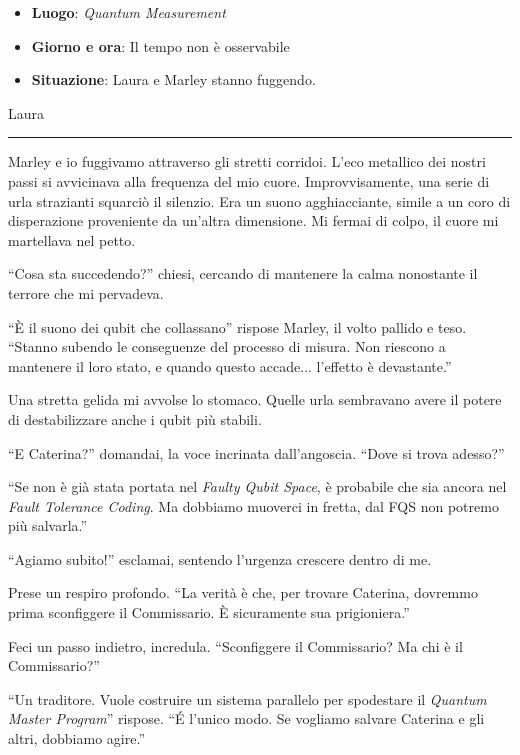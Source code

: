 \begin{tcolorbox}[colback=gray!5,colframe=gray!80,title=\textbf{Scheda Informativa}]
\begin{itemize}
    \item \textbf{Luogo}:  \emph{Quantum Measurement}
    \item \textbf{Giorno e ora}: Il tempo non è osservabile
    \item \textbf{Situazione}: Laura e Marley stanno fuggendo.
\end{itemize}
\end{tcolorbox}

\vspace{1em}
\begin{center}Laura\end{center}
\hrule
\vspace{1em}

 Marley e io fuggivamo attraverso gli stretti corridoi. L'eco metallico dei nostri passi si avvicinava alla frequenza del mio cuore. Improvvisamente, una serie di urla strazianti squarciò il silenzio. Era un suono agghiacciante, simile a un coro di disperazione proveniente da un'altra dimensione. Mi fermai di colpo, il cuore mi martellava nel petto.

\begin{dialogue}
 \enquote{Cosa sta succedendo?} chiesi, cercando di mantenere la calma nonostante il terrore che mi pervadeva.

 \enquote{È il suono dei qubit che collassano} rispose Marley, il volto pallido e teso. \enquote{Stanno subendo le conseguenze del processo di misura. Non riescono a mantenere il loro stato, e quando questo accade... l'effetto è devastante.}
\end{dialogue}

Una stretta gelida mi avvolse lo stomaco. Quelle urla sembravano avere il potere di destabilizzare anche i qubit più stabili.

\begin{dialogue}
 \enquote{E Caterina?} domandai, la voce incrinata dall'angoscia. \enquote{Dove si trova adesso?}

  \enquote{Se non è già stata portata nel \textit{Faulty Qubit Space}, è probabile che sia ancora nel \textit{Fault Tolerance Coding}. Ma dobbiamo muoverci in fretta, dal FQS non potremo più salvarla.}

 \enquote{Agiamo subito!} esclamai, sentendo l'urgenza crescere dentro di me.

 Prese un respiro profondo. \enquote{La verità è che, per trovare Caterina, dovremmo prima sconfiggere il Commissario. È sicuramente sua prigioniera.}

 Feci un passo indietro, incredula. \enquote{Sconfiggere il Commissario? Ma chi è il Commissario?}

 \enquote{Un traditore. Vuole costruire un sistema parallelo per spodestare il \textit{Quantum Master Program}} rispose. \enquote{\'E l'unico modo. Se vogliamo salvare Caterina e gli altri, dobbiamo agire.}
\end{dialogue}

